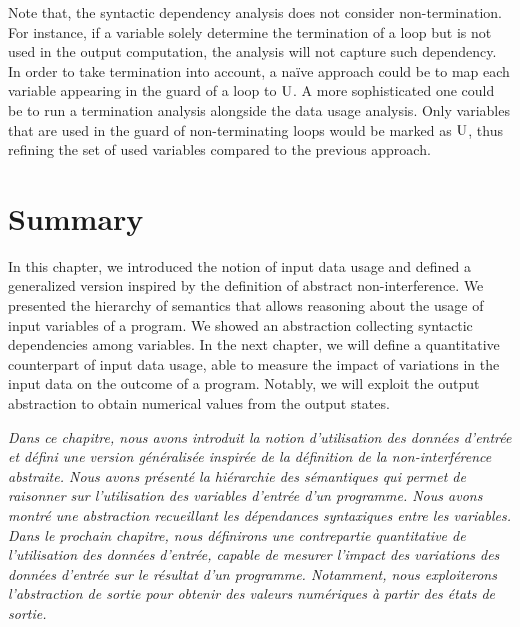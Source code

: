 Note that, the syntactic dependency analysis does not consider non-termination. For instance, if a variable solely determine the termination of a loop but is not used in the output computation, the analysis will not capture such dependency.
In order to take termination into account, a na\"ive approach could be to map each variable appearing in the guard of a loop to $\textup{U}$. A more sophisticated one could be to run a termination analysis alongside the data usage analysis.
Only variables that are used in the guard of non-terminating loops would be marked as $\textup{U}$, thus refining the set of used variables compared to the previous approach.

\section{Summary}

In this chapter, we introduced the notion of input data usage and defined a generalized version inspired by the definition of abstract non-interference.
We presented the hierarchy of semantics that allows reasoning about the usage of input variables of a program.
We showed an abstraction collecting syntactic dependencies among variables.
In the next chapter, we will define a quantitative counterpart of input data usage, able to measure the impact of variations in the input data on the outcome of a program.
Notably, we will exploit the output abstraction to obtain numerical values from the output states.

\emph{Dans ce chapitre, nous avons introduit la notion d'utilisation des données d'entrée et défini une version généralisée inspirée de la définition de la non-interférence abstraite. Nous avons présenté la hiérarchie des sémantiques qui permet de raisonner sur l'utilisation des variables d'entrée d'un programme. Nous avons montré une abstraction recueillant les dépendances syntaxiques entre les variables. Dans le prochain chapitre, nous définirons une contrepartie quantitative de l'utilisation des données d'entrée, capable de mesurer l'impact des variations des données d'entrée sur le résultat d'un programme. Notamment, nous exploiterons l'abstraction de sortie pour obtenir des valeurs numériques à partir des états de sortie.}
